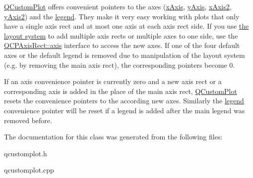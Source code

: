 \hyperlink{classQCustomPlot}{Q\+Custom\+Plot} offers convenient pointers to the axes (\hyperlink{classQCustomPlot_a9a79cd0158a4c7f30cbc702f0fd800e4}{x\+Axis}, \hyperlink{classQCustomPlot_af6fea5679725b152c14facd920b19367}{y\+Axis}, \hyperlink{classQCustomPlot_ada41599f22cad901c030f3dcbdd82fd9}{x\+Axis2}, \hyperlink{classQCustomPlot_af13fdc5bce7d0fabd640f13ba805c0b7}{y\+Axis2}) and the \hyperlink{classQCustomPlot_a4eadcd237dc6a09938b68b16877fa6af}{legend}. They make it very easy working with plots that only have a single axis rect and at most one axis at each axis rect side. If you use \hyperlink{}{the layout system} to add multiple axis rects or multiple axes to one side, use the \hyperlink{classQCPAxisRect_a583ae4f6d78b601b732183f6cabecbe1}{Q\+C\+P\+Axis\+Rect\+::axis} interface to access the new axes. If one of the four default axes or the default legend is removed due to manipulation of the layout system (e.\+g. by removing the main axis rect), the corresponding pointers become 0.

If an axis convenience pointer is currently zero and a new axis rect or a corresponding axis is added in the place of the main axis rect, \hyperlink{classQCustomPlot}{Q\+Custom\+Plot} resets the convenience pointers to the according new axes. Similarly the \hyperlink{classQCustomPlot_a4eadcd237dc6a09938b68b16877fa6af}{legend} convenience pointer will be reset if a legend is added after the main legend was removed before. 

The documentation for this class was generated from the following files\+:\begin{DoxyCompactItemize}
\item 
qcustomplot.\+h\item 
qcustomplot.\+cpp\end{DoxyCompactItemize}
